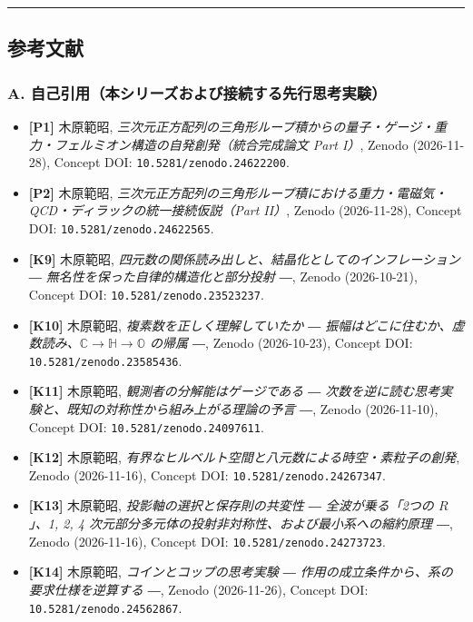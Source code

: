 \documentclass[
  a4paper,
]{ltjsarticle}
\providecommand{\tightlist}{%
  \setlength{\itemsep}{0pt}\setlength{\parskip}{0pt}}
\begin{document}
\begin{center}\rule{0.5\linewidth}{0.5pt}\end{center}

\subsection{参考文献}\label{ux53c2ux8003ux6587ux732e}

\subsubsection{A.
自己引用（本シリーズおよび接続する先行思考実験）}\label{a.-ux81eaux5df1ux5f15ux7528ux672cux30b7ux30eaux30fcux30baux304aux3088ux3073ux63a5ux7d9aux3059ux308bux5148ux884cux601dux8003ux5b9fux9a13}

\begin{itemize}
\tightlist
\item
  \textbf{{[}P1{]}} 木原範昭,
  \emph{三次元正方配列の三角形ループ積からの量子・ゲージ・重力・フェルミオン構造の自発創発（統合完成論文
  Part I）}, Zenodo (2026-11-28), Concept DOI:
  \texttt{10.5281/zenodo.24622200}.
\item
  \textbf{{[}P2{]}} 木原範昭,
  \emph{三次元正方配列の三角形ループ積における重力・電磁気・QCD・ディラックの統一接続仮説（Part
  II）}, Zenodo (2026-11-28), Concept DOI:
  \texttt{10.5281/zenodo.24622565}.
\item
  \textbf{{[}K9{]}} 木原範昭,
  \emph{四元数の関係読み出しと、結晶化としてのインフレーション ―
  無名性を保った自律的構造化と部分投射 ―}, Zenodo (2026-10-21), Concept
  DOI: \texttt{10.5281/zenodo.23523237}.
\item
  \textbf{{[}K10{]}} 木原範昭, \emph{複素数を正しく理解していたか ―
  振幅はどこに住むか、虚数読み、\(\mathbb{C}\to\mathbb{H}\to\mathbb{O}\)
  の帰属 ―}, Zenodo (2026-10-23), Concept DOI:
  \texttt{10.5281/zenodo.23585436}.
\item
  \textbf{{[}K11{]}} 木原範昭, \emph{観測者の分解能はゲージである ―
  次数を逆に読む思考実験と、既知の対称性から組み上がる理論の予言 ―},
  Zenodo (2026-11-10), Concept DOI: \texttt{10.5281/zenodo.24097611}.
\item
  \textbf{{[}K12{]}} 木原範昭,
  \emph{有界なヒルベルト空間と八元数による時空・素粒子の創発}, Zenodo
  (2026-11-16), Concept DOI: \texttt{10.5281/zenodo.24267347}.
\item
  \textbf{{[}K13{]}} 木原範昭, \emph{投影軸の選択と保存則の共変性 ―
  全波が乗る「2つの \(R\)」、1, 2, 4
  次元部分多元体の投射非対称性、および最小系への縮約原理 ―}, Zenodo
  (2026-11-16), Concept DOI: \texttt{10.5281/zenodo.24273723}.
\item
  \textbf{{[}K14{]}} 木原範昭, \emph{コインとコップの思考実験 ―
  作用の成立条件から、系の要求仕様を逆算する ―}, Zenodo (2026-11-26),
  Concept DOI: \texttt{10.5281/zenodo.24562867}.
\end{itemize}
\end{document}
